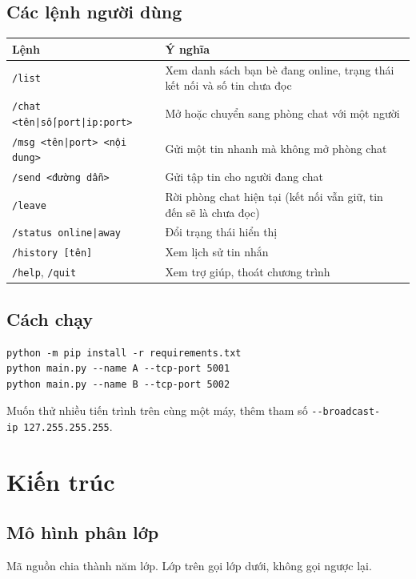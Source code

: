 \documentclass[a4paper,12pt]{article}
\newcommand{\code}[1]{\texttt{#1}}
\begin{document}
\subsection{Các lệnh người dùng}
\begin{center}
\begin{tabularx}{\textwidth}{@{}l X@{}}
\toprule
\textbf{Lệnh} & \textbf{Ý nghĩa} \\
\midrule
\code{/list} & Xem danh sách bạn bè đang online, trạng thái kết nối và số tin chưa đọc \\
\code{/chat <tên|số|port|ip:port>} & Mở hoặc chuyển sang phòng chat với một người \\
\code{/msg <tên|port> <nội dung>} & Gửi một tin nhanh mà không mở phòng chat \\
\code{/send <đường dẫn>} & Gửi tập tin cho người đang chat \\
\code{/leave} & Rời phòng chat hiện tại (kết nối vẫn giữ, tin đến sẽ là chưa đọc) \\
\code{/status online|away} & Đổi trạng thái hiển thị \\
\code{/history [tên]} & Xem lịch sử tin nhắn \\
\code{/help}, \code{/quit} & Xem trợ giúp, thoát chương trình \\
\bottomrule
\end{tabularx}
\end{center}

\subsection{Cách chạy}
\begin{verbatim}
python -m pip install -r requirements.txt
python main.py --name A --tcp-port 5001
python main.py --name B --tcp-port 5002
\end{verbatim}
Muốn thử nhiều tiến trình trên cùng một máy, thêm tham số \code{-{}-broadcast-ip}\ \code{127.255.255.255}.

\section{Kiến trúc}

\subsection{Mô hình phân lớp}
Mã nguồn chia thành năm lớp. Lớp trên gọi lớp dưới, không gọi ngược lại.
\end{document}
